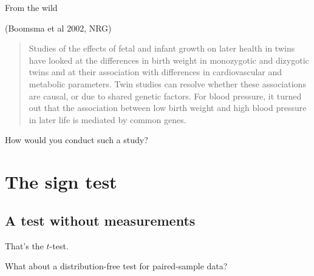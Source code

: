\begin{frame}{From the wild}

   (Boomsma et al 2002, NRG)
  \begin{quote}
Studies of the effects of fetal and infant growth on later health in twins have looked at the differences in birth weight in monozygotic and dizygotic twins and at their association with differences in cardiovascular and metabolic parameters. Twin studies can resolve whether these associations are causal, or due to shared genetic factors. For blood pressure, it turned out that the association between low birth weight and high blood pressure in later life is mediated by common genes.
  \end{quote}

    \vspace{2em}

    How would you conduct such a study?

\end{frame}


\section{The sign test}

\subsection{A test without measurements}

\begin{frame}{}

    \vfill

    That's the $t$-test.

    \vfill

    What about a \alert{distribution-free} test for paired-sample data?

    \vfill

\end{frame}

